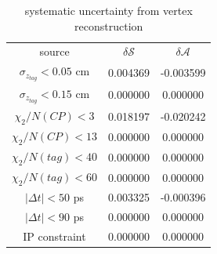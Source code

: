 \begin{table}[H]
	\begin{minipage}[b]{1.0\linewidth}
		\centering
		\caption{systematic uncertainty from vertex reconstruction}
		\label{tab:sy_vertex}
		\begin{tabular}{c c c}
			\hline
			source & $\delta \mathcal{S}$ & $\delta \mathcal{A}$ \\
			$\sigma_{z_{tag}}<0.05$ cm & 0.004369
& -0.003599
\\
			$\sigma_{z_{tag}}<0.15$ cm & 0.000000 & 0.000000 \\
			$\chi_2/N(CP)<3$ & 0.018197
& -0.020242
\\
			$\chi_2/N(CP)<13$ & 0.000000 & 0.000000\\
			$\chi_2/N(tag)<40$ & 0.000000
& 0.000000
\\
			$\chi_2/N(tag)<60$ & 0.000000 & 0.000000\\
			$|\Delta t|<50 $ ps & 0.003325
& -0.000396
\\
			$|\Delta t|<90 $ ps & 0.000000 & 0.000000\\
			IP constraint & 0.000000& 0.000000\\
						\hline
		\end{tabular}
	\end{minipage}
\end{table}

